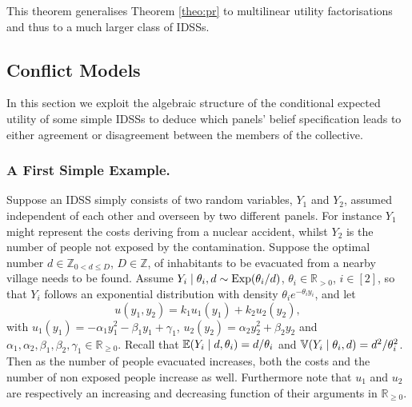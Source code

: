 This theorem generalises Theorem \ref{theo:pr} to multilinear utility factorisations and thus to a much larger class of IDSSs. 

  
\subsection{Conflict Models}
In this section we exploit the algebraic structure of the conditional expected utility of some simple IDSSs to deduce which panels' belief specification leads to either agreement or disagreement between the members of the collective. 
 
\subsubsection{A First Simple Example.}
\label{sec:quadratic}
Suppose an IDSS simply consists of two random variables, $Y_1$ and $Y_2$, assumed independent of each other and overseen by two different panels. For instance $Y_1$ might represent the costs deriving from a nuclear accident, whilst $Y_2$ is the number of people not exposed by the contamination. Suppose  the optimal number  $d\in \mathbb{Z}_{0< d\leq D}$, $D\in\mathbb{Z}$, of inhabitants to be evacuated from a nearby village needs to be found. Assume $Y_i\;|\;\theta_i,d\sim \textnormal{Exp}(\theta_i/d)$, $\theta_i\in\mathbb{R}_{> 0}$, $i\in[2]$, so that $Y_i$ follows an exponential distribution with density $\theta_ie^{-\theta_iy_i}$,  and let
\begin{equation*}
u(y_1,y_2)=k_1u_1(y_1)+k_2u_2(y_2),
\end{equation*}
with $u_1(y_1)=-\alpha_1y_1^2-\beta_1y_1+\gamma_1$, $u_2(y_2)=\alpha_2y_2^2+\beta_2y_2$ and $\alpha_1,\alpha_2,\beta_1,\beta_2,\gamma_1\in\mathbb{R}_{\geq 0}$. Recall that $\mathbb{E}(Y_i\;|\;d,\theta_i)=d/\theta_i$ and $\mathbb{V}(Y_i\;|\;\theta_i,d)=d^2/\theta_i^2$. Then as the number of people evacuated increases, both the costs and the number of non exposed people increase as well. Furthermore note that $u_1$ and $u_2$ are respectively an increasing and decreasing function of their arguments in $\mathbb{R}_{\geq 0}$.

